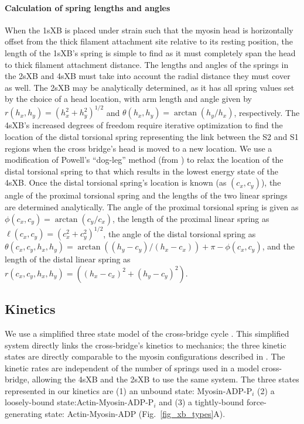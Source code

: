 \documentclass[]{article}
\begin{document}
\paragraph{Calculation of spring lengths and angles} %
When the 1sXB is placed under strain such that the myosin head is horizontally offset from the thick filament attachment site relative to its resting position, the length of the 1sXB's spring is simple to find as it must completely span the head to thick filament attachment distance.
The lengths and angles of the springs in the 2sXB and 4sXB must take into account the radial distance they must cover as well.
The 2sXB may be analytically determined, as it has all spring values set by the choice of a head location, with arm length and angle given by $r(h_x, h_y)=(h_x^2 + h_y^2)^{1/2}$ and $\theta(h_x, h_y)=\arctan(h_y/h_x)$, respectively.
The 4sXB's increased degrees of freedom require iterative optimization to find the location of the distal torsional spring representing the link between the S2 and S1 regions when the cross bridge's head is moved to a new location.
We use a modification of Powell's ``dog-leg'' method (from \citet{SciPy}) to relax the location of the distal torsional spring to that which results in the lowest energy state of the 4sXB.
Once the distal torsional spring's location is known (as $(c_x, c_y)$), the angle of the proximal torsional spring and the lengths of the two linear springs are determined analytically.
The angle of the proximal torsional spring is given as $\phi(c_x, c_y)=\arctan(c_y/c_x)$, the length of the proximal linear spring as $\ell(c_x, c_y)=(c_x^2 + c_y^2)^{1/2}$, the angle of the distal torsional spring as $\theta(c_x, c_y, h_x, h_y) = \arctan((h_y-c_y)/(h_x-c_x)) + \pi - \phi(c_x, c_y)$, and the length of the distal linear spring as $r(c_x, c_y, h_x, h_y)=((h_x-c_x)^2 + (h_y-c_y)^2)$.

\subsection*{Kinetics} %

We use a simplified three state model of the cross-bridge cycle \citep{Pate1989, Tanner2007}. 
This simplified system directly links the cross-bridge's kinetics to mechanics; the three kinetic states are directly comparable to the myosin configurations described in \citet{Houdusse2000}. 
The kinetic rates are independent of the number of springs used in a model cross-bridge, allowing the 4sXB and the 2sXB to use the same system. 
The three states represented in our kinetics are (1) an unbound state: Myosin-ADP-P$_i$ (2) a loosely-bound state:Actin-Myosin-ADP-P$_i$ and (3) a tightly-bound force-generating state: Actin-Myosin-ADP (Fig.~\ref{fig_xb_types}A).
\end{document}
